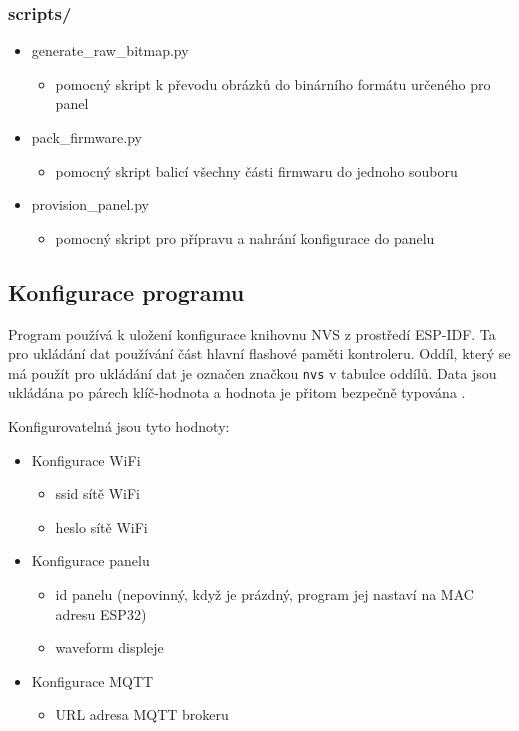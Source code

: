 \subsubsection*{scripts/}
\begin{itemize}
    \item generate\_raw\_bitmap.py
    \begin{itemize}
        \item pomocný skript k převodu obrázků do binárního formátu určeného pro panel
    \end{itemize}
    \item pack\_firmware.py
    \begin{itemize}
        \item pomocný skript balicí všechny části firmwaru do jednoho souboru
    \end{itemize}
    \item provision\_panel.py
    \begin{itemize}
        \item pomocný skript pro přípravu a nahrání konfigurace do panelu
    \end{itemize}
\end{itemize}

\subsection{Konfigurace programu}\label{konfigurace-panelu}
Program používá k uložení konfigurace knihovnu NVS z prostředí ESP-IDF. Ta pro ukládání dat používání část hlavní flashové paměti kontroleru. Oddíl, který se má použít pro ukládání dat je označen značkou \verb|nvs| v tabulce oddílů. Data jsou ukládána po párech klíč-hodnota a hodnota je přitom bezpečně typována \cite{NonVolatileStorageLibrary}.

Konfigurovatelná jsou tyto hodnoty:
\begin{itemize}
    \item Konfigurace WiFi
    \begin{itemize}
        \item ssid sítě WiFi
        \item heslo sítě WiFi
    \end{itemize}
    \item Konfigurace panelu
    \begin{itemize}
        \item id panelu (nepovinný, když je prázdný, program jej nastaví na MAC adresu ESP32)
        \item waveform displeje
    \end{itemize}
    \item Konfigurace MQTT
    \begin{itemize}
        \item URL adresa MQTT brokeru
    \end{itemize}
\end{itemize}

